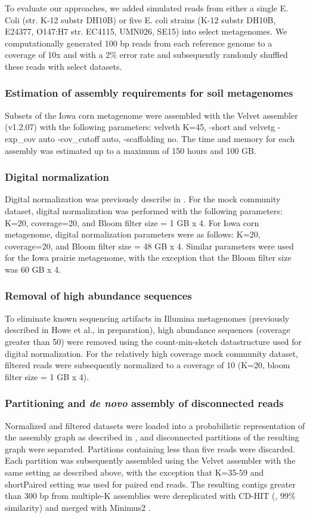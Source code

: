 \documentclass[11pt]{article} %
\begin{document}
To evaluate our approaches, we added simulated reads from either a
single E. Coli (str. K-12 substr DH10B) or five E. coli strains (K-12
substr DH10B, E24377, O147:H7 str. EC4115, UMN026, SE15) into select
metagenomes.  We computationally generated 100 bp reads from each
reference genome to a coverage of 10x and with a 2\% error rate and
subsequently randomly shuffled these reads with select datasets.

\subsubsection*{Estimation of assembly requirements for soil metagenomes}
Subsets of the Iowa corn metagenome were assembled with the Velvet
assembler (v1.2.07) with the following parameters: velveth K=45,
-short and velvetg -exp\_cov auto -cov\_cutoff auto, -scaffolding no.
The time and memory for each assembly was estimated up to a maximum of
150 hours and 100 GB.

\subsubsection*{Digital normalization}
Digital normalization was previously describe in \cite{browndiginorm}.  
For the mock
community dataset, digital normalization was performed with the
following parameters: K=20, coverage=20, and Bloom filter size = 1 GB
x 4.  For Iowa corn metagenome, digital normalization parameters were
as follows: K=20, coverage=20, and Bloom filter size = 48 GB x 4.
Similar parameters were used for the Iowa prairie metagenome, with the
exception that the Bloom filter size was 60 GB x 4.

\subsubsection*{Removal of high abundance sequences}
To eliminate known sequencing artifacts in Illumina metagenomes
(previously described in Howe et al., in preparation), high abundance 
sequences (coverage
greater than 50) were removed using the count-min-sketch datastructure
used for digital normalization.  For the relatively high coverage mock
community dataset, filtered reads were subsequently normalized to a
coverage of 10 (K=20, bloom filter size = 1 GB x 4).

\subsubsection*{Partitioning and \emph{de novo} assembly of disconnected reads}
Normalized and filtered datasets were loaded into a probabilistic
representation of the assembly graph as described in \cite{Pell:2012cq}, and
disconnected partitions of the resulting graph were separated.
Partitions containing less than five reads were discarded.  Each
partition was subsequently assembled using the Velvet assembler with
the same setting as described above, with the exception that K=35-59
and shortPaired setting was used for paired end reads.  The resulting
contigs greater than 300 bp from multiple-K assemblies were
dereplicated with CD-HIT (\cite{Fu:2012jk}, 99\% similarity) and merged with
Minimus2 \cite{Sommer:2007p1253}.
\end{document}

